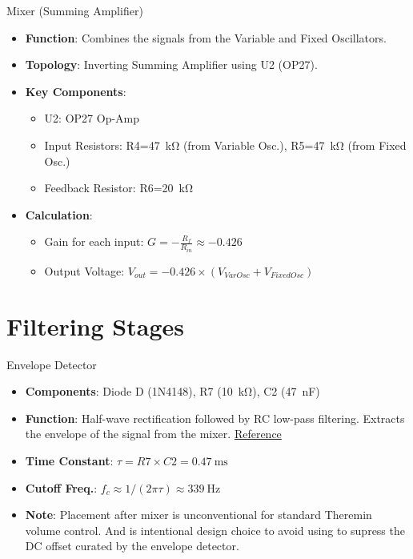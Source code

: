 \documentclass[10pt,xcolor={table,dvipsnames},t]{beamer}
\begin{document}
\begin{frame}{Mixer (Summing Amplifier)}
\begin{itemize}
    \item \textbf{Function}: Combines the signals from the Variable and Fixed Oscillators.
    \item \textbf{Topology}: Inverting Summing Amplifier using U2 (OP27).
    \item \textbf{Key Components}:
    \begin{itemize}
        \item U2: OP27 Op-Amp
        \item Input Resistors: R4=\SI{47}{\kilo\ohm} (from Variable Osc.), R5=\SI{47}{\kilo\ohm} (from Fixed Osc.)
        \item Feedback Resistor: R6=\SI{20}{\kilo\ohm}
    \end{itemize}
    \item \textbf{Calculation}:
    \begin{itemize}
        \item Gain for each input: $G = -\frac{R_f}{R_{in}} \approx -0.426$
        \item Output Voltage: $V_{out} = -0.426 \times (V_{VarOsc} + V_{FixedOsc})$
    \end{itemize}
\end{itemize}
\end{frame}

\section{Filtering Stages}

\begin{frame}{Envelope Detector}
\begin{itemize}
    \item \textbf{Components}: Diode D (1N4148), R7 (\SI{10}{\kilo\ohm}), C2 (\SI{47}{\nano\farad})
    \item \textbf{Function}: Half-wave rectification followed by RC low-pass filtering. Extracts the envelope of the signal from the mixer. \href{https://www.winlab.rutgers.edu/~crose/322_html/envelope_detector.html}{Reference}
    \item \textbf{Time Constant}: $\tau = R7 \times C2 = \SI{0.47}{\milli\second}$
    \item \textbf{Cutoff Freq.}: $f_c \approx 1/(2\pi\tau) \approx \SI{339}{\hertz}$
    \item \textbf{Note}: Placement after mixer is unconventional for standard Theremin volume control. And is intentional design choice to avoid using to supress the DC offset curated by the envelope detector.
\end{itemize}
\end{frame}
\end{document}
